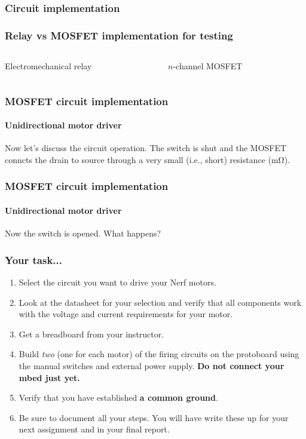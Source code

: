 \documentclass[aspectratio=169]{beamer}
\begin{document}
\begin{frame}
\frametitle{Circuit implementation}
\end{frame}

\begin{frame}
\frametitle{Relay vs {MOSFET} implementation for testing}
\begin{columns}
\begin{column}{0.5\textwidth}
Electromechanical relay
\end{column}
\begin{column}{0.5\textwidth}
$n$-channel MOSFET
\end{column}
\end{columns}
\end{frame}

\begin{frame}
\frametitle{{MOSFET} circuit implementation}
\framesubtitle{Unidirectional motor driver}
Now let's discuss the circuit operation. The switch is shut and the MOSFET conncts the drain to source through a very small (i.e., short) resistance (\si{\milli\ohm}). 
\end{frame}

\begin{frame}
\frametitle{{MOSFET} circuit implementation}
\framesubtitle{Unidirectional motor driver}
Now the switch is opened. What happens? 
\end{frame}

\begin{frame}
\frametitle{Your task...}
\begin{enumerate}
\item Select the circuit you want to drive your Nerf motors.
\item Look at the datasheet for your selection and verify that all components work with the voltage and current requirements for your motor.
\item Get a breadboard from your instructor.
\item Build \emph{two} (one for each motor) of the firing circuits on the protoboard using the manual switches and external power supply. \textbf{Do not connect your mbed just yet.}
\item Verify that you have established \textbf{a common ground}.
\item Be sure to document all your steps.  You will have write these up for your next assignment and in your final report.
\end{enumerate}
\end{frame}
\end{document}
